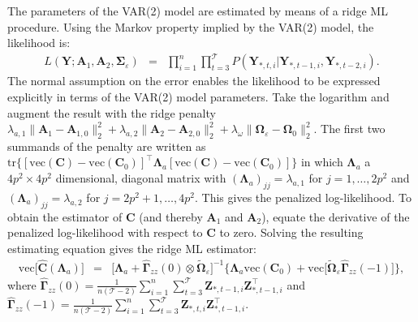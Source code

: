 The parameters of the VAR(2) model are estimated by means of a ridge ML procedure. Using the Markov property implied by the VAR(2) model, the likelihood is:
\begin{eqnarray*}
L(\mathbf{Y}; \mathbf{A}_1, \mathbf{A}_2, \boldsymbol{\Sigma}_{\varepsilon}) & = & \prod_{i=1}^n \prod_{t=3}^{\mathcal{T}}P(\mathbf{Y}_{*,t,i}|\mathbf{Y}_{*,t-1,i},\mathbf{Y}_{*,t-2,i}).
\end{eqnarray*}
The normal assumption on the error enables the likelihood to be expressed explicitly in terms of the VAR(2) model parameters. Take the logarithm and augment the result with the ridge penalty $\lambda_{a,1} \| \mathbf{A}_1 - \mathbf{A}_{1,0} \|_2^2 + \lambda_{a,2} \| \mathbf{A}_2 - \mathbf{A}_{2,0} \|_2^2 + \lambda_{\omega} \| \mathbf{\Omega}_{\varepsilon} - \mathbf{\Omega}_{0} \|_2^2$. The first two summands of the penalty are written as $\mbox{tr}\{ [ \mbox{vec}(\mathbf{C}) - \mbox{vec}(\mathbf{C}_0)]^{\top} \mathbf{\Lambda}_a [ \mbox{vec}(\mathbf{C}) - \mbox{vec}(\mathbf{C}_0)] \}$ in which $\mathbf{\Lambda}_a$ a $4p^2 \times 4p^2$ dimensional, diagonal matrix with $(\mathbf{\Lambda}_a)_{jj} = \lambda_{a,1}$ for $j=1,\ldots, 2p^2$ and $(\mathbf{\Lambda}_a)_{jj} = \lambda_{a,2}$ for $j=2p^2 +1,\ldots, 4p^2$. This gives the penalized log-likelihood. To obtain the estimator of $\mathbf{C}$ (and thereby $\mathbf{A}_1$ and $\mathbf{A}_2$), equate the derivative of the penalized log-likelihood with respect to $\mathbf{C}$ to zero. Solving the resulting estimating equation gives the ridge ML estimator:
\begin{eqnarray*}
\textrm{vec} \big[\widehat{\mathbf{C}}(\boldsymbol{\Lambda}_a) \big] & = & \big[\boldsymbol{\Lambda}_a + \widehat{\boldsymbol{\Gamma}}_{zz}(0) \otimes\tilde{\boldsymbol{\Omega}}_{\varepsilon} \big]^{-1}
\big\{ \boldsymbol{\Lambda}_a \textrm{vec}(\mathbf{C}_0)+\textrm{vec} \big[ \tilde{\boldsymbol{\Omega}}_{\varepsilon} \widehat{\boldsymbol{\Gamma}}_{zz}(-1)\big] \big\},
\end{eqnarray*}
where $\widehat{\boldsymbol{\Gamma}}_{zz} (0) = \frac{1}{n(\mathcal{T}-2)} \sum_{i=1}^{n} \sum_{t=3}^{\mathcal{T}} \mathbf{Z}_{*,t-1,i} \mathbf{Z}_{*,t-1,i}^{\top}$ and \\
 $\widehat{\boldsymbol{\Gamma}}_{zz}(-1) = \frac{1}{n (\mathcal{T}-2) } \sum_{i=1}^{n} \sum_{t=3}^{\mathcal{T}} \mathbf{Z}_{*,t,i}\mathbf{Z}_{*,t-1,i}^{\top}$. 


